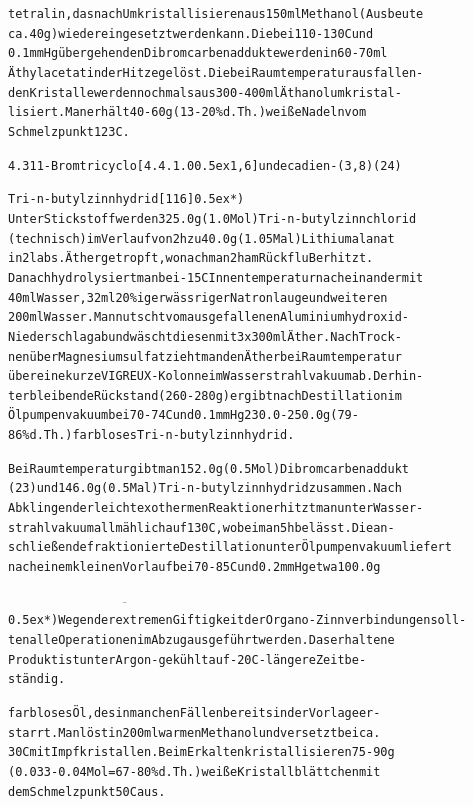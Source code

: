 \documentclass[a4paper,11pt]{article}
\begin{document}
\begin{alltt}
\newpage
{}


tetralin, das nach Umkristallisieren aus 150 ml Methanol (Ausbeute
ca. 40 g) wieder eingesetzt werden kann. Die bei 110 - 130\degree{}C und
0.1 mm Hg übergehenden Dibromcarbenaddukte werden in 60 - 70 ml
Äthylacetat in der Hitze gelöst. Die bei Raumtemperatur ausfallen-
den Kristalle werden nochmals aus 300 - 400 ml Äthanol umkristal-
lisiert. Man erhält 40 - 60 g (13 - 20 \% d.Th.) weiße Nadeln vom
Schmelzpunkt 123\degree{}C.

4.3  11-Bromtricyclo[4.4.1.0\raise0.5ex\hbox{1,6}]undecadien-(3‚8) (24)

Tri-n-butylzinnhydrid [116] \leavevmode\raise0.5ex\hbox{*})
Unter Stickstoff werden 325.0 g (1.0 Mol) Tri-n-butylzinnchlorid
(technisch) im Verlauf von 2 h zu 40.0 g (1.05 Mal) Lithiumalanat
in 2 l abs. Äther getropft, wonach man 2 h am RückfluB erhitzt.
Danach hydrolysiert man bei -15\degree{}C Innentemperatur nacheinander mit
40 ml Wasser, 32 ml 20 \%iger wässriger Natronlauge und weiteren
200 ml Wasser. Man nutscht vom ausgefallenen Aluminiumhydroxid-
Niederschlag ab und wäscht diesen mit 3 x 300 ml Äther. Nach Trock-
nen über Magnesiumsulfat zieht man den Äther bei Raumtemperatur
über eine kurze VIGREUX-Kolonne im Wasserstrahlvakuum ab. Der hin-
terbleibende Rückstand (260 - 280 g) ergibt nach Destillation im
Ölpumpenvakuum bei 70 - 74\degree{}C und 0.1 mm Hg 230.0 - 250.0 g (79 -
86 \% d.Th.) farbloses Tri-n-butylzinnhydrid.

Bei Raumtemperatur gibt man 152.0 g (0.5 Mol) Dibromcarbenaddukt
(23) und 146.0 g (0.5 Mal) Tri-n-butylzinnhydrid zusammen. Nach
Abklingen der leicht exothermen Reaktion erhitzt man unter Wasser-
strahlvakuum allmählich auf 130\degree{}C, wobei man 5 h belässt. Die an-
schließende fraktionierte Destillation unter Ölpumpenvakuum liefert
nach einem kleinen Vorlauf bei 70 - 85\degree{}C und 0.2 mm Hg etwa 100.0 g

\(\overline{\hspace{7cm}}\)
\leavevmode\raise0.5ex\hbox{*}) Wegen der extremen Giftigkeit der Organo-Zinnverbindungen soll-
   ten alle Operationen im Abzug ausgeführt werden. Das erhaltene
   Produkt ist unter Argon - gekühlt auf -20\degree{}C - längere Zeit be-
   ständig.

\newpage
{}



farbloses Öl, des in manchen Fällen bereits in der Vorlage er-
starrt. Man löst in 200 ml warmen Methanol und versetzt bei ca.
30\degree{}C mit Impfkristallen. Beim Erkalten kristallisieren 75 - 90 g
(0.033 - 0.04 Mol = 67 - 80 \% d.Th.) weiße Kristallblättchen mit
dem Schmelzpunkt 50\degree{}C aus.


\end{alltt}
\end{document}
